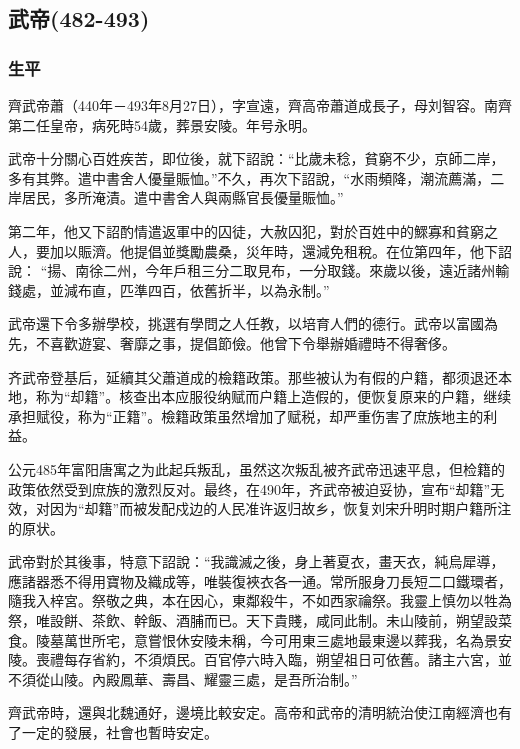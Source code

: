 
\subsection{武帝\tiny(482-493)}

\subsubsection{生平}

齊武帝蕭（440年－493年8月27日），字宣遠，齊高帝蕭道成長子，母刘智容。南齊第二任皇帝，病死時54歲，葬景安陵。年号永明。

武帝十分關心百姓疾苦，即位後，就下詔說：“比歲未稔，貧窮不少，京師二岸，多有其弊。遣中書舍人優量賑恤。”不久，再次下詔說，“水雨頻降，潮流薦滿，二岸居民，多所淹漬。遣中書舍人與兩縣官長優量賑恤。”

第二年，他又下詔酌情遣返軍中的囚徒，大赦囚犯，對於百姓中的鰥寡和貧窮之人，要加以賑濟。他提倡並獎勵農桑，災年時，還減免租稅。在位第四年，他下詔說： “揚、南徐二州，今年戶租三分二取見布，一分取錢。來歲以後，遠近諸州輸錢處，並減布直，匹準四百，依舊折半，以為永制。”

武帝還下令多辦學校，挑選有學問之人任教，以培育人們的德行。武帝以富國為先，不喜歡遊宴、奢靡之事，提倡節儉。他曾下令舉辦婚禮時不得奢侈。

齐武帝登基后，延續其父蕭道成的檢籍政策。那些被认为有假的户籍，都须退还本地，称为“却籍”。核查出本应服役纳赋而户籍上造假的，便恢复原来的户籍，继续承担赋役，称为“正籍”。檢籍政策虽然增加了赋税，却严重伤害了庶族地主的利益。

公元485年富阳唐寓之为此起兵叛乱，虽然这次叛乱被齐武帝迅速平息，但检籍的政策依然受到庶族的激烈反对。最终，在490年，齐武帝被迫妥协，宣布“却籍”无效，对因为“却籍”而被发配戍边的人民准许返归故乡，恢复刘宋升明时期户籍所注的原状。

武帝對於其後事，特意下詔說：“我識滅之後，身上著夏衣，畫天衣，純烏犀導，應諸器悉不得用寶物及織成等，唯裝復裌衣各一通。常所服身刀長短二口鐵環者，隨我入梓宮。祭敬之典，本在因心，東鄰殺牛，不如西家禴祭。我靈上慎勿以牲為祭，唯設餅、茶飲、幹飯、酒脯而已。天下貴賤，咸同此制。未山陵前，朔望設菜食。陵墓萬世所宅，意嘗恨休安陵未稱，今可用東三處地最東邊以葬我，名為景安陵。喪禮每存省約，不須煩民。百官停六時入臨，朔望祖日可依舊。諸主六宮，並不須從山陵。內殿鳳華、壽昌、耀靈三處，是吾所治制。”

齊武帝時，還與北魏通好，邊境比較安定。高帝和武帝的清明統治使江南經濟也有了一定的發展，社會也暫時安定。

